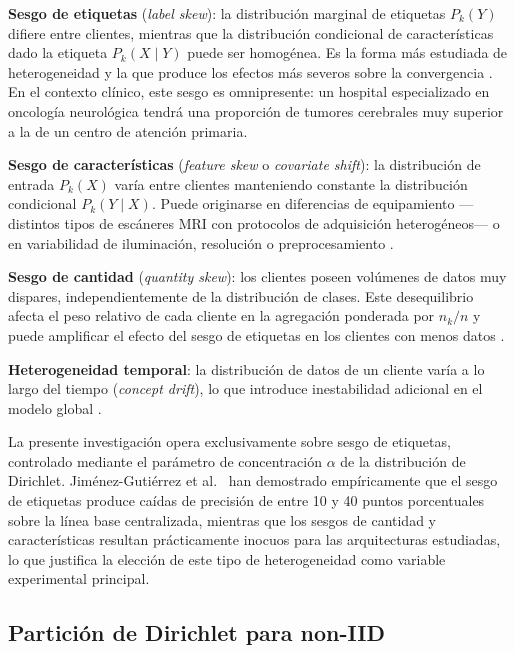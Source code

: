 \textbf{Sesgo de etiquetas} (\textit{label skew}): la distribución marginal de etiquetas
$P_k(Y)$ difiere entre clientes, mientras que la distribución condicional de características
dado la etiqueta $P_k(X \mid Y)$ puede ser homogénea. Es la forma más estudiada de
heterogeneidad y la que produce los efectos más severos sobre la convergencia
\cite{jimenez2503thorough}. En el contexto clínico, este sesgo es omnipresente: un hospital
especializado en oncología neurológica tendrá una proporción de tumores cerebrales muy
superior a la de un centro de atención primaria.

\textbf{Sesgo de características} (\textit{feature skew} o \textit{covariate shift}):
la distribución de entrada $P_k(X)$ varía entre clientes manteniendo constante la distribución
condicional $P_k(Y \mid X)$. Puede originarse en diferencias de equipamiento —distintos tipos
de escáneres MRI con protocolos de adquisición heterogéneos— o en variabilidad de iluminación,
resolución o preprocesamiento \cite{g2024noniiddatafederatedlearning}.

\textbf{Sesgo de cantidad} (\textit{quantity skew}): los clientes poseen volúmenes de datos
muy dispares, independientemente de la distribución de clases. Este desequilibrio afecta el
peso relativo de cada cliente en la agregación ponderada por $n_k / n$ y puede amplificar el
efecto del sesgo de etiquetas en los clientes con menos datos
\cite{g2024noniiddatafederatedlearning}.

\textbf{Heterogeneidad temporal}: la distribución de datos de un cliente varía a lo largo
del tiempo (\textit{concept drift}), lo que introduce inestabilidad adicional en el modelo
global \cite{DBLP:journals/corr/abs-1912-04977}.

La presente investigación opera exclusivamente sobre sesgo de etiquetas, controlado mediante
el parámetro de concentración $\alpha$ de la distribución de Dirichlet. Jiménez-Gutiérrez et al.\
\cite{jimenez2503thorough} han demostrado empíricamente que el sesgo de etiquetas produce
caídas de precisión de entre 10 y 40 puntos porcentuales sobre la línea base centralizada,
mientras que los sesgos de cantidad y características resultan prácticamente inocuos para
las arquitecturas estudiadas, lo que justifica la elección de este tipo de heterogeneidad
como variable experimental principal.

\subsection{Partición de Dirichlet para non-IID}

